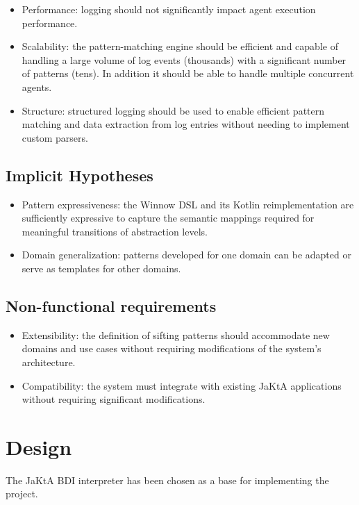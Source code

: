 \documentclass{scrartcl}
\begin{document}
\begin{itemize}
    \item Performance: logging should not significantly impact agent execution performance.
    \item Scalability: the pattern-matching engine should be efficient and capable of handling a large volume of log events (thousands) with a significant number of patterns (tens). In addition it should be able to handle multiple concurrent agents.
    \item Structure: structured logging should be used to enable efficient pattern matching and data extraction from log entries without needing to implement custom parsers.
\end{itemize}

\subsection{Implicit Hypotheses}

\begin{itemize}
    \item Pattern expressiveness: the Winnow DSL and its Kotlin reimplementation are sufficiently expressive to capture the semantic mappings required for meaningful transitions of abstraction levels.
    \item Domain generalization: patterns developed for one domain can be adapted or serve as templates for other domains.
\end{itemize}

\subsection{Non-functional requirements}

\begin{itemize}
    \item Extensibility: the definition of sifting patterns should accommodate new domains and use cases without requiring modifications of the system's architecture.
    \item Compatibility: the system must integrate with existing JaKtA applications without requiring significant modifications.
\end{itemize}

\section{Design}

The JaKtA BDI interpreter \cite{DBLP:conf/eumas/BaiardiBCP23} has been chosen as a base for implementing the project.
\end{document}
